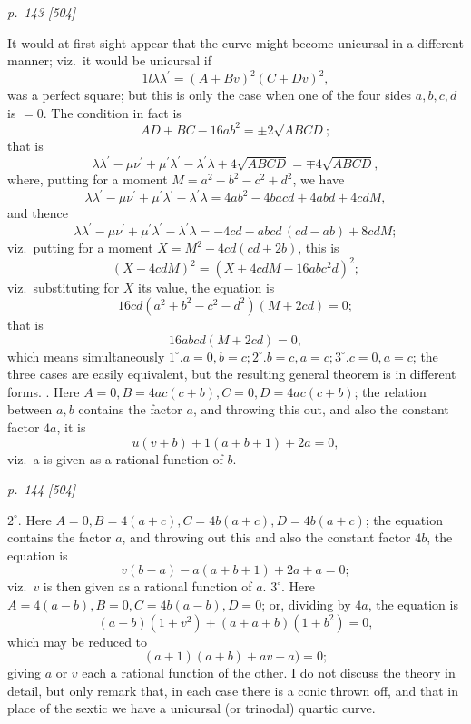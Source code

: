 \documentclass[11pt,a4paper]{book}
\begin{document}
\bigskip
\textit{p.~143 [504]}
\smallskip

\noindent
It would at first sight appear that the curve might become unicursal in a different
manner; viz.\ it would be unicursal if
\[
1l\lambda\lambda^\prime = (A + Bv)^2 (C + Dv)^2,
\]
was a perfect square; but this is only the case when one of the four sides $a, b, c, d$ is $= 0$. The condition in fact is
\[
AD + BC - 16 a b^2 = \pm 2 \sqrt{ABCD};
\]
that is
\[
\lambda\lambda^\prime - \mu\nu^\prime + \mu^\prime\lambda^\prime - \lambda^\prime\lambda + 4 \sqrt{ABCD} = \mp 4 \sqrt{ABCD},
\]
where, putting for a moment $M = a^2 - b^2 - c^2 + d^2$, we have
\[
\lambda\lambda^\prime - \mu\nu^\prime + \mu^\prime\lambda^\prime - \lambda^\prime\lambda = 4 a b^2 - 4 b a c d + 4 a b d + 4 c d M,
\]
and thence
\[
\lambda\lambda^\prime - \mu\nu^\prime + \mu^\prime\lambda^\prime - \lambda^\prime\lambda = -4 c d - a b c d \,(c d - a b) + 8 c d M;
\]
viz.\ putting for a moment $X = M^2 - 4 c d (c d + 2 b)$, this is
\[
(X - 4 c d M)^2 = (X + 4 c d M - 16 a b c^2 d)^2;
\]
viz.\ substituting for $X$ its value, the equation is
\[
16 c d (a^2 + b^2 - c^2 - d^2) (M + 2 c d) = 0;
\]
that is
\[
16 a b c d (M + 2 c d) = 0,
\]
which means simultaneously $1^\circ. a = 0, b = c; 2^\circ. b = c, a = c; 3^\circ. c = 0, a = c$; the
three cases are easily equivalent, but the resulting general theorem is in different forms.
. Here $A = 0, B = 4 a c (c + b), C = 0, D = 4 a c (c + b)$; the relation between $a, b$
contains the factor $a$, and throwing this out, and also the constant factor $4a$, it is
\[
u (v + b) + 1 (a + b + 1) + 2 a = 0,
\]
viz.\ a is given as a rational function of $b$.

\clearpage

\bigskip
\textit{p.~144 [504]}
\smallskip

\noindent
$2^\circ$. Here $A = 0, B = 4 (a + c), C = 4 b (a + c), D = 4 b (a + c)$; the equation contains the
factor $a$, and throwing out this and also the constant factor $4 b$, the equation is
\[
v (b - a) - a (a + b + 1) + 2 a + a = 0;
\]
viz.\ $v$ is then given as a rational function of $a$.
\quad $3^\circ$. Here $A = 4 (a - b), B = 0, C = 4 b (a - b), D = 0$; or, dividing by $4 a$, the
equation is
\[
(a - b) (1 + v^2) + (a + a + b) (1 + b^2) = 0,
\]
which may be reduced to
\[
(a + 1)(a + b) + a v + a) = 0;
\]
giving $a$ or $v$ each a rational function of the other.
I do not discuss the theory in detail, but only remark that, in each case there is
a conic thrown off, and that in place of the sextic we have a unicursal (or trinodal)
quartic curve.
\end{document}
